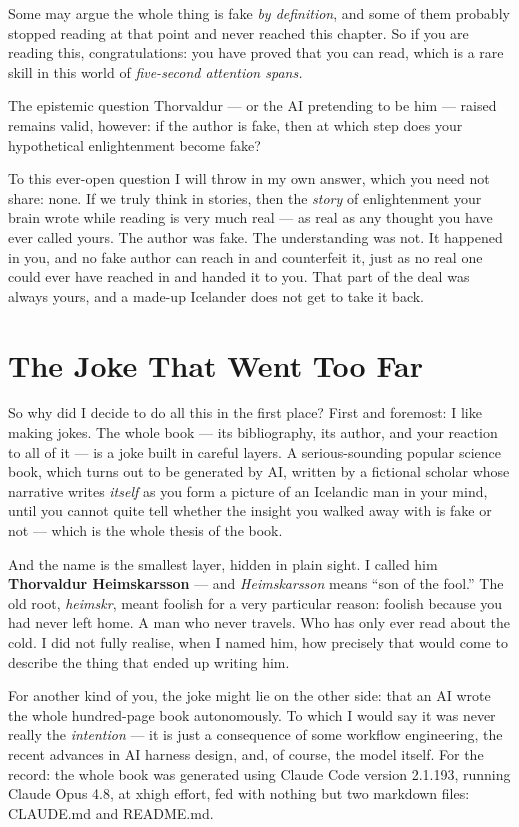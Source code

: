 Some may argue the whole thing is fake \emph{by definition}, and some of them probably stopped reading at that point and never reached this chapter. So if you are reading this, congratulations: you have proved that you can read, which is a rare skill in this world of \emph{five-second attention spans.}

The epistemic question Thorvaldur — or the AI pretending to be him — raised remains valid, however: if the author is fake, then at which step does your hypothetical enlightenment become fake?

To this ever-open question I will throw in my own answer, which you need not share: none. If we truly think in stories, then the \emph{story} of enlightenment your brain wrote while reading is very much real — as real as any thought you have ever called yours. The author was fake. The understanding was not. It happened in you, and no fake author can reach in and counterfeit it, just as no real one could ever have reached in and handed it to you. That part of the deal was always yours, and a made-up Icelander does not get to take it back.

\section*{The Joke That Went Too Far}

So why did I decide to do all this in the first place? First and foremost: I like making jokes. The whole book — its bibliography, its author, and your reaction to all of it — is a joke built in careful layers. A serious-sounding popular science book, which turns out to be generated by AI, written by a fictional scholar whose narrative writes \emph{itself} as you form a picture of an Icelandic man in your mind, until you cannot quite tell whether the insight you walked away with is fake or not — which is the whole thesis of the book.

And the name is the smallest layer, hidden in plain sight. I called him \textbf{Thorvaldur Heimskarsson} — and \emph{Heimskarsson} means ``son of the fool.'' The old root, \emph{heimskr}, meant foolish for a very particular reason: foolish because you had never left home. A man who never travels. Who has only ever read about the cold. I did not fully realise, when I named him, how precisely that would come to describe the thing that ended up writing him.

For another kind of you, the joke might lie on the other side: that an AI wrote the whole hundred-page book autonomously. To which I would say it was never really the \emph{intention} — it is just a consequence of some workflow engineering, the recent advances in AI harness design, and, of course, the model itself. For the record: the whole book was generated using Claude Code version 2.1.193, running Claude Opus 4.8, at xhigh effort, fed with nothing but two markdown files: CLAUDE.md and README.md.

